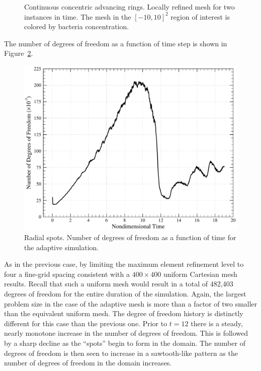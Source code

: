 \begin{figure}[hbtp]
\begin{center}
    \caption[Radial spots.  Locally refined mesh for two instances in time.]{Continuous concentric advancing rings.  Locally refined mesh for two instances in time.  The mesh in the $[-10,10]^2$ region of interest is colored by bacteria concentration.\label{fig:bio_radial_spots_amr}}
  \end{center}
\end{figure}

The number of degrees of freedom as a function of time step is shown in Figure~\ref{fig:bio_radial_spots_amr_dofs}.
\begin{figure}
  \includegraphics[width=\textwidth]{figures/bio_radial_spots/dofs}
  \caption{Radial spots. Number of degrees of freedom as a function of time for the adaptive simulation.\label{fig:bio_radial_spots_amr_dofs}}
\end{figure}
As in the previous case, by limiting the maximum element refinement level to four a fine-grid spacing consistent with a $400 \times 400$ uniform Cartesian mesh results.  Recall that such a uniform mesh would result in a total of 482,403 degrees of freedom for the entire duration of the simulation. Again, the largest problem size in the case of the adaptive mesh is more than a factor of two smaller than the equivalent uniform mesh.  The degree of freedom history is distinctly different for this case than the previous one.  Prior to $t=12$ there is a steady, nearly monotone increase in the number of degrees of freedom.  This is followed by a sharp decline as the ``spots'' begin to form in the domain.  The number of degrees of freedom is then seen to increase in a sawtooth-like pattern as the number of degrees of freedom in the domain increases.

